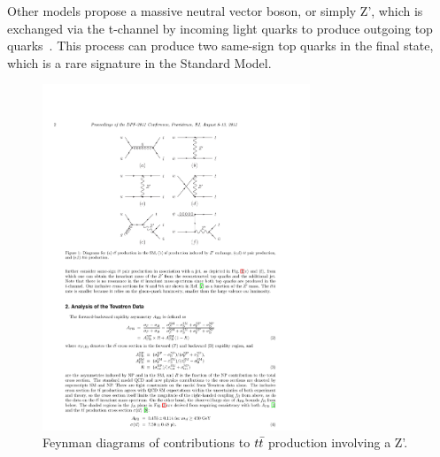 Other models propose a massive neutral vector boson, or simply Z', which is exchanged via the t-channel by incoming light quarks to produce outgoing top quarks~\cite{Berger:2011vi,Bhattacherjee:2011do}.
This process can produce two same-sign top quarks in the final state, which is a rare signature in the Standard Model.

\begin{figure}
  \begin{center}
    \includegraphics[width=80mm]{figures/theory/AsymmetryZPrimeModel}
  \end{center}
  \caption{Feynman diagrams of contributions to $t\bar{t}$ production involving a Z'.}
  \label{img:CDFAsymmetryMass}
\end{figure}


